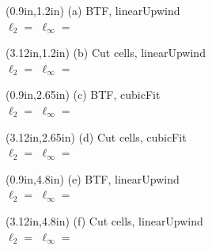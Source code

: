 \documentclass{article}
\begin{document}
\TPMargin{1pt}
\begin{textblock*}{12em}(0.9in,1.2in)
\normalsize
(a) BTF, linearUpwind \\
\hspace*{0.3em}$\ell_2 = $
\hspace*{1em}$\ell_\infty = $
\end{textblock*}

\begin{textblock*}{12em}(3.12in,1.2in)
\normalsize
(b) Cut cells, linearUpwind \\
\hspace*{0.3em}$\ell_2 = $
\hspace*{1em}$\ell_\infty = $
\end{textblock*}

\begin{textblock*}{12em}(0.9in,2.65in)
\normalsize
(c) BTF, cubicFit \\
\hspace*{0.3em}$\ell_2 = $
\hspace*{1em}$\ell_\infty = $
\end{textblock*}

\begin{textblock*}{12em}(3.12in,2.65in)
\normalsize
(d) Cut cells, cubicFit \\
\hspace*{0.3em}$\ell_2 = $
\hspace*{1em}$\ell_\infty = $
\end{textblock*}

\begin{textblock*}{12em}(0.9in,4.8in)
\normalsize
(e) BTF, linearUpwind \\
\hspace*{0.3em}$\ell_2 = $
\hspace*{1em}$\ell_\infty = $
\end{textblock*}

\begin{textblock*}{12em}(3.12in,4.8in)
\normalsize
(f) Cut cells, linearUpwind \\
\hspace*{0.3em}$\ell_2 = $
\hspace*{1em}$\ell_\infty = $
\end{textblock*}
\end{document}
